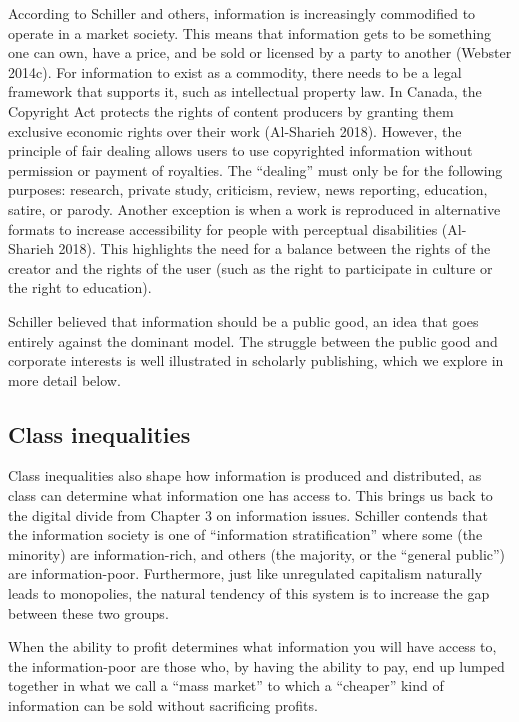 \documentclass[
  letterpaper,
  DIV=11,
  numbers=noendperiod]{scrreprt}
\begin{document}
According to Schiller and others, information is increasingly
commodified to operate in a market society. This means that information
gets to be something one can own, have a price, and be sold or licensed
by a party to another (Webster 2014c). For information to exist as a
commodity, there needs to be a legal framework that supports it, such as
intellectual property law. In Canada, the Copyright Act protects the
rights of content producers by granting them exclusive economic rights
over their work (Al-Sharieh 2018). However, the principle of fair
dealing allows users to use copyrighted information without permission
or payment of royalties. The ``dealing'' must only be for the following
purposes: research, private study, criticism, review, news reporting,
education, satire, or parody. Another exception is when a work is
reproduced in alternative formats to increase accessibility for people
with perceptual disabilities (Al-Sharieh 2018). This highlights the need
for a balance between the rights of the creator and the rights of the
user (such as the right to participate in culture or the right to
education).

Schiller believed that information should be a public good, an idea that
goes entirely against the dominant model. The struggle between the
public good and corporate interests is well illustrated in scholarly
publishing, which we explore in more detail below.

\subsection{Class inequalities}\label{class-inequalities}

Class inequalities also shape how information is produced and
distributed, as class can determine what information one has access to.
This brings us back to the digital divide from Chapter 3 on information
issues. Schiller contends that the information society is one of
``information stratification'' where some (the minority) are
information-rich, and others (the majority, or the ``general public'')
are information-poor. Furthermore, just like unregulated capitalism
naturally leads to monopolies, the natural tendency of this system is to
increase the gap between these two groups.

When the ability to profit determines what information you will have
access to, the information-poor are those who, by having the ability to
pay, end up lumped together in what we call a ``mass market'' to which a
``cheaper'' kind of information can be sold without sacrificing profits.
\end{document}
